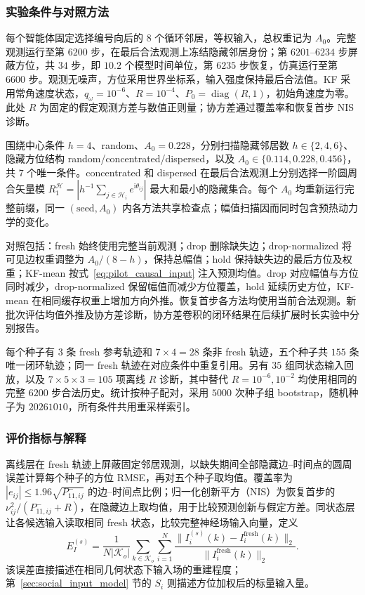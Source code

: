 \documentclass[UTF8,fontset=windows,11pt]{ctexart}
\begin{document}
\subsubsection{实验条件与对照方法}

每个智能体固定选择编号向后的 $8$ 个循环邻居，等权输入，总权重记为 $A_0$。完整观测运行至第 $6200$ 步，在最后合法观测上冻结隐藏邻居身份；第 $6201$--$6234$ 步屏蔽方位，共 $34$ 步，即 $10.2$ 个模型时间单位，第 $6235$ 步恢复，仿真运行至第 $6600$ 步。观测无噪声，方位采用世界坐标系，输入强度保持最后合法值。KF 采用常角速度状态，$q_\omega=10^{-6}$、$R=10^{-4}$、$P_0=\operatorname{diag}(R,1)$，初始角速度为零。此处 $R$ 为固定的假定观测方差与数值正则量；协方差通过覆盖率和恢复首步 NIS 诊断。

围绕中心条件 $h=4$、random、$A_0=0.228$，分别扫描隐藏邻居数 $h\in\{2,4,6\}$、隐藏方位结构 random/concentrated/dispersed，以及 $A_0\in\{0.114,0.228,0.456\}$，共 $7$ 个唯一条件。concentrated 和 dispersed 在最后合法观测上分别选择一阶圆周合矢量模 $R_1^{\mathcal H}=|h^{-1}\sum_{j\in\mathcal H_i}e^{\mathrm{i}\theta_{ij}}|$ 最大和最小的隐藏集合。每个 $A_0$ 均重新运行完整前缀，同一 $(\text{seed},A_0)$ 内各方法共享检查点；幅值扫描因而同时包含预热动力学的变化。

对照包括：fresh 始终使用完整当前观测；drop 删除缺失边；drop-normalized 将可见边权重调整为 $A_0/(8-h)$，保持总幅值；hold 保持缺失边的最后方位及权重；KF-mean 按式~\eqref{eq:pilot_causal_input} 注入预测均值。drop 对应幅值与方位同时减少，drop-normalized 保留幅值而减少方位覆盖，hold 延续历史方位，KF-mean 在相同缓存权重上增加方向外推。恢复首步各方法均使用当前合法观测。新批次评估均值外推及协方差诊断，协方差卷积的闭环结果在后续扩展时长实验中分别报告。

每个种子有 $3$ 条 fresh 参考轨迹和 $7\times4=28$ 条非 fresh 轨迹，五个种子共 $155$ 条唯一闭环轨迹；同一 fresh 轨迹在对应条件中重复引用。另有 $35$ 组同状态输入回放，以及 $7\times5\times3=105$ 项离线 $R$ 诊断，其中替代 $R=10^{-6},10^{-2}$ 均使用相同的完整 $6200$ 步合法历史。统计按种子配对，采用 $5000$ 次种子组 bootstrap，随机种子为 $20261010$，所有条件共用重采样索引。

\subsubsection{评价指标与解释}

离线层在 fresh 轨迹上屏蔽固定邻居观测，以缺失期间全部隐藏边--时间点的圆周误差计算每个种子的方位 RMSE，再对五个种子取均值。覆盖率为 $|e_{ij}|\le1.96\sqrt{P_{11,ij}^{-}}$ 的边--时间点比例；归一化创新平方（NIS）为恢复首步的 $\nu_{ij}^2/(P_{11,ij}^{-}+R)$，在隐藏边上取均值，用于比较预测创新与假定方差。同状态层让各候选输入读取相同 fresh 状态，比较完整神经场输入向量，定义
\begin{equation}
 E_I^{(s)}=\frac{1}{N|\mathcal K_o|}
 \sum_{k\in\mathcal K_o}\sum_{i=1}^N
 \frac{\|I_i^{(s)}(k)-I_i^{\mathrm{fresh}}(k)\|_2}
 {\|I_i^{\mathrm{fresh}}(k)\|_2}.
 \label{eq:pilot_input_error}
\end{equation}
该误差直接描述在相同几何状态下输入场的重建程度；第~\ref{sec:social_input_model} 节的 $S_i$ 则描述方位加权后的标量输入量。
\end{document}
